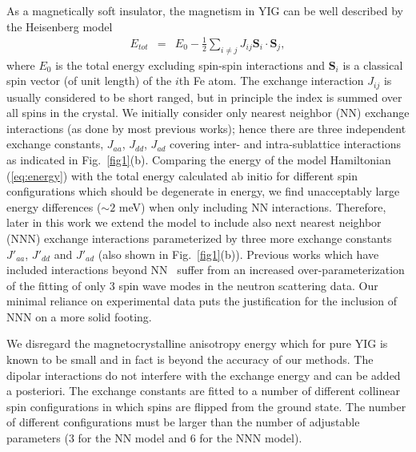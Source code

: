 \documentclass[aps,pre,reprint,superscriptaddress,longbibliography]{revtex4-1}
\begin{document}
As a magnetically soft insulator, the magnetism in YIG can be well described by the Heisenberg model
%
\begin{eqnarray}
E_{tot}&=&E_0-\frac{1}{2}\sum_{i \neq j}J_{ij}\mathbf{S}_i \cdot \mathbf{S}_j ,
\label{eq:energy}
\end{eqnarray}
%
where $E_0$ is the total energy excluding spin-spin interactions and $\mathbf{S}_i$ is a classical spin vector (of unit length) of the $i$th Fe atom. The exchange interaction $J_{ij}$ is usually considered to be short ranged, but in principle the index is summed over all spins in the crystal.  We initially consider only nearest neighbor (NN) exchange interactions (as done by most previous works); hence there are three independent exchange constants, $J_{aa}$, $J_{dd}$, $J_{ad}$ covering inter- and intra-sublattice interactions as indicated in Fig.~\ref{fig1}(b). Comparing
the energy of the model Hamiltonian (\ref{eq:energy}) with the total energy
calculated ab initio for different spin configurations which should be degenerate in energy, we find unacceptably large energy differences ($\sim2$ meV)
when only including NN interactions. Therefore, later in this work we extend the model to include also next nearest neighbor (NNN) exchange interactions parameterized by three more exchange constants $J'_{aa}$, $J'_{dd}$ and $J'_{ad}$ (also shown in Fig.~\ref{fig1}(b)). Previous works which have included interactions beyond NN~\cite{Plant1983} suffer from an increased over-parameterization of the fitting of only 3 spin wave modes in the neutron scattering data. Our minimal reliance on experimental data puts the justification for the inclusion of NNN on a more solid footing.  

We disregard the magnetocrystalline anisotropy energy which for pure YIG is known to be small and in fact is beyond the accuracy of our methods. The dipolar interactions do not interfere with the exchange energy and can be added a posteriori. The exchange constants are fitted to a number of different collinear spin configurations in which spins are flipped from the ground state. The number of different configurations must be larger than the number of adjustable parameters (3 for the NN model and 6 for the NNN model). 
\end{document}
